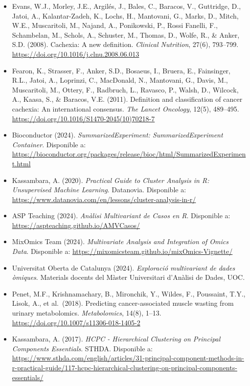 \documentclass[
]{article}
\begin{document}
\begin{itemize}
\item
  Evans, W.J., Morley, J.E., Argilés, J., Bales, C., Baracos, V.,
  Guttridge, D., Jatoi, A., Kalantar-Zadeh, K., Lochs, H., Mantovani,
  G., Marks, D., Mitch, W.E., Muscaritoli, M., Najand, A., Ponikowski,
  P., Rossi Fanelli, F., Schambelan, M., Schols, A., Schuster, M.,
  Thomas, D., Wolfe, R., \& Anker, S.D. (2008). Cachexia: A new
  definition. \emph{Clinical Nutrition}, 27(6), 793--799.
  \url{https://doi.org/10.1016/j.clnu.2008.06.013}
\item
  Fearon, K., Strasser, F., Anker, S.D., Bosaeus, I., Bruera, E.,
  Fainsinger, R.L., Jatoi, A., Loprinzi, C., MacDonald, N., Mantovani,
  G., Davis, M., Muscaritoli, M., Ottery, F., Radbruch, L., Ravasco, P.,
  Walsh, D., Wilcock, A., Kaasa, S., \& Baracos, V.E. (2011). Definition
  and classification of cancer cachexia: An international consensus.
  \emph{The Lancet Oncology}, 12(5), 489--495.
  \url{https://doi.org/10.1016/S1470-2045(10)70218-7}
\item
  Bioconductor (2024). \emph{SummarizedExperiment: SummarizedExperiment
  Container}. Disponible a:
  \url{https://bioconductor.org/packages/release/bioc/html/SummarizedExperiment.html}
\item
  Kassambara, A. (2020). \emph{Practical Guide to Cluster Analysis in R:
  Unsupervised Machine Learning}. Datanovia. Disponible a:
  \url{https://www.datanovia.com/en/lessons/cluster-analysis-in-r/}
\item
  ASP Teaching (2024). \emph{Anàlisi Multivariant de Casos en R}.
  Disponible a: \url{https://aspteaching.github.io/AMVCasos/}
\item
  MixOmics Team (2024). \emph{Multivariate Analysis and Integration of
  Omics Data}. Disponible a:
  \url{https://mixomicsteam.github.io/mixOmics-Vignette/}
\item
  Universitat Oberta de Catalunya (2024). \emph{Exploració multivariant
  de dades òmiques}. Materials docents del Màster Universitari d'Anàlisi
  de Dades, UOC.
\item
  Penet, M.F., Krishnamachary, B., Mironchik, Y., Wildes, F., Poussaint,
  T.Y., Lisok, A., et al.~(2018). Predicting cancer-associated muscle
  wasting from urinary metabolomics. \emph{Metabolomics}, 14(8), 1--13.
  \url{https://doi.org/10.1007/s11306-018-1405-2}
\item
  Kassambara, A. (2017). \emph{HCPC - Hierarchical Clustering on
  Principal Components Essentials}. STHDA. Disponible a:
  \url{https://www.sthda.com/english/articles/31-principal-component-methods-in-r-practical-guide/117-hcpc-hierarchical-clustering-on-principal-components-essentials/}
\end{itemize}
\end{document}
